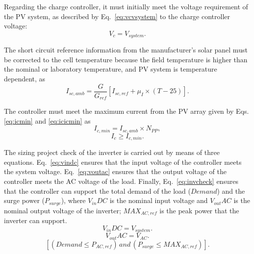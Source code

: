 \documentclass[10pt,conference]{IEEEtran}
\begin{document}
Regarding the charge controller, it must initially meet the voltage requirement of the PV system, as described by Eq.~\eqref{eq:vcvsystem} to the charge controller voltage: 
\begin{equation}
\label{eq:vcvsystem}
\scriptstyle V_{c} = \scriptstyle V_{system}.
\end{equation}

The short circuit reference information from the manufacturer's solar panel must be corrected to the cell temperature because the field temperature is higher than the nominal or laboratory temperature, and PV system is temperature dependent, as 
%
\begin{equation}
\label{eq:iscamb}
\scriptstyle I_{sc,amb} = \dfrac{\scriptstyle G}{\scriptstyle G_{ref}} \left[ \scriptstyle I_{sc,ref} + \scriptstyle \mu_{I} \scriptstyle \times \scriptstyle (T-25) \right]. 
\end{equation}

The controller must meet the maximum current from the PV array given by Eqs. \eqref{eq:icmin} and \eqref{eq:icicmin} as
\begin{equation}
\label{eq:icmin}
\scriptstyle I_{c,min} = \scriptstyle I_{sc,amb} \times \scriptstyle N_{PP},
\end{equation}
%
\begin{equation}
\label{eq:icicmin}
\scriptstyle I_{c} \geq \scriptstyle I_{c,min}.
\end{equation}

The sizing project check of the inverter is carried out by means of three equations. Eq.~\eqref{eq:vindc} ensures that the input voltage of the controller meets the system voltage. Eq.~\eqref{eq:voutac} ensures that the output voltage of the controller meets the AC voltage of the load. Finally, Eq.~\eqref{eq:invcheck} ensures that the controller can support the total demand of the load ($Demand$) and the surge power ($P_{surge}$), where $V_{in}DC$ is the nominal input voltage and $V_{out}AC$ is the nominal output voltage of the inverter; $MAX_{AC,ref}$ is the peak power that the inverter can support.
%
\begin{equation}
\label{eq:vindc} 
\scriptstyle V_{in}DC = \scriptstyle V_{system}.
\end{equation}
%
\begin{equation}
\label{eq:voutac} 
\scriptstyle V_{out}AC = \scriptstyle V_{AC}.
\end{equation}
%
\begin{equation}
\label{eq:invcheck} 
\left[ (\scriptstyle Demand \leq \scriptstyle P_{AC,ref}) \, \scriptstyle and \, \scriptstyle (P_{surge} \leq MAX_{AC,ref}) \right].
\end{equation}
\end{document}
